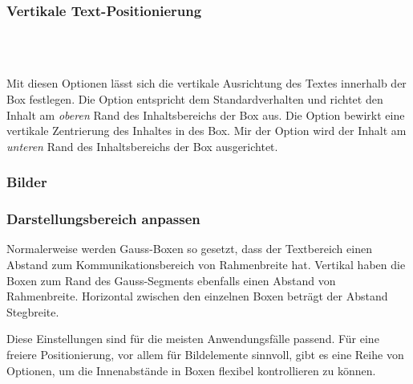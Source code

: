 \subsubsection{Vertikale Text-Positionierung}

\begin{Declaration}
  \\
  \\
\end{Declaration}

Mit diesen Optionen lässt sich die vertikale Ausrichtung des Textes innerhalb
der Box festlegen. Die Option  entspricht dem Standardverhalten und richtet
den Inhalt am \emph{oberen} Rand des Inhaltsbereichs der Box aus.
Die Option  bewirkt eine vertikale Zentrierung des Inhaltes in des Box.
Mir der Option  wird der Inhalt am \emph{unteren} Rand des
Inhaltsbereichs der Box ausgerichtet.

\subsubsection{Bilder}

\begin{Declaration}
\end{Declaration}

\subsubsection{Darstellungsbereich anpassen}

Normalerweise werden Gauss-Boxen so gesetzt, dass der Textbereich
einen Abstand zum Kommunikationsbereich von Rahmenbreite hat.
Vertikal haben die Boxen zum Rand des Gauss-Segments ebenfalls einen
Abstand von Rahmenbreite.
Horizontal zwischen den einzelnen Boxen beträgt der Abstand Stegbreite.

Diese Einstellungen sind für die meisten Anwendungsfälle passend.
Für eine freiere Positionierung, vor allem für Bildelemente sinnvoll, gibt
es eine Reihe von Optionen, um die Innenabstände in Boxen flexibel
kontrollieren zu können.

\begin{Declaration}
  \\
  \\
\end{Declaration}

